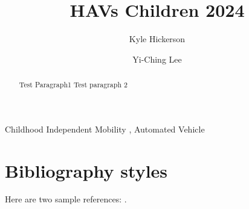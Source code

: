 \documentclass[review, 3p,
authoryear]{elsarticle} %
\begin{document}
\begin{frontmatter}

  \title{HAVs Children 2024}
    \author[GMU]{Kyle Hickerson%
  }
    \author[GMU]{Yi-Ching Lee%
  }
  
  \begin{abstract}
  Test Paragraph1 Test paragraph 2
  \end{abstract}
    \begin{keyword}
    Childhood Independent Mobility \sep 
    Automated Vehicle
  \end{keyword}
  
 \end{frontmatter}

\hypertarget{bibliography-styles}{%
\section{Bibliography styles}\label{bibliography-styles}}

Here are two sample references:
\citeauthor{bennettsWhatInfluencesParents2018}
\citetext{\citeyear{bennettsWhatInfluencesParents2018}; \citealp{williamsMethodVarianceMarker2010}}.

\renewcommand\refname{References}

\end{document}

